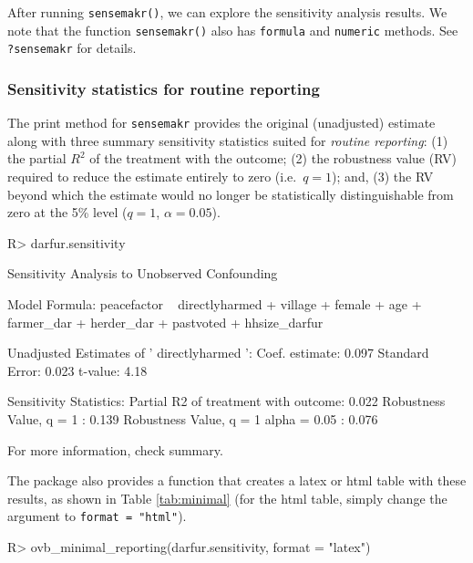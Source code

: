 \documentclass[
]{jss}
\begin{document}
After running \texttt{sensemakr()}, we can explore the sensitivity
analysis results. We note that the function \texttt{sensemakr()} also
has \texttt{formula} and \texttt{numeric} methods. See
\texttt{?sensemakr} for details.

\hypertarget{sensitivity-statistics-for-routine-reporting}{%
\subsubsection{Sensitivity statistics for routine
reporting}\label{sensitivity-statistics-for-routine-reporting}}

The print method for \texttt{sensemakr} provides the original
(unadjusted) estimate along with three summary sensitivity statistics
suited for \emph{routine reporting}: (1) the partial \(R^2\) of the
treatment with the outcome; (2) the robustness value (RV) required to
reduce the estimate entirely to zero (i.e.~\(q=1\)); and, (3) the RV
beyond which the estimate would no longer be statistically
distinguishable from zero at the 5\% level (\(q=1\), \(\alpha=0.05\)).

\begin{CodeChunk}

\begin{CodeInput}
R> darfur.sensitivity
\end{CodeInput}

\begin{CodeOutput}
Sensitivity Analysis to Unobserved Confounding

Model Formula: peacefactor ~ directlyharmed + village + female + age + farmer_dar + 
    herder_dar + pastvoted + hhsize_darfur

Unadjusted Estimates of ' directlyharmed ':
  Coef. estimate: 0.097 
  Standard Error: 0.023 
  t-value: 4.18 

Sensitivity Statistics:
  Partial R2 of treatment with outcome: 0.022 
  Robustness Value, q = 1 : 0.139 
  Robustness Value, q = 1 alpha = 0.05 : 0.076 

For more information, check summary.
\end{CodeOutput}
\end{CodeChunk}

The package also provides a function that creates a latex or html table
with these results, as shown in Table \ref{tab:minimal} (for the html
table, simply change the argument to \texttt{format\ =\ "html"}).

\begin{CodeChunk}

\begin{CodeInput}
R> ovb_minimal_reporting(darfur.sensitivity, format = "latex")
\end{CodeInput}
\end{CodeChunk}
\end{document}
